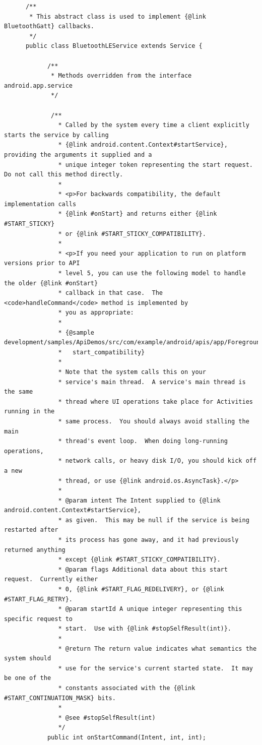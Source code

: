     \begin{lstlisting}
      /**
       * This abstract class is used to implement {@link BluetoothGatt} callbacks.
       */
      public class BluetoothLEService extends Service {

            /**
             * Methods overridden from the interface android.app.service
             */

             /**
               * Called by the system every time a client explicitly starts the service by calling
               * {@link android.content.Context#startService}, providing the arguments it supplied and a
               * unique integer token representing the start request.  Do not call this method directly.
               *
               * <p>For backwards compatibility, the default implementation calls
               * {@link #onStart} and returns either {@link #START_STICKY}
               * or {@link #START_STICKY_COMPATIBILITY}.
               *
               * <p>If you need your application to run on platform versions prior to API
               * level 5, you can use the following model to handle the older {@link #onStart}
               * callback in that case.  The <code>handleCommand</code> method is implemented by
               * you as appropriate:
               *
               * {@sample development/samples/ApiDemos/src/com/example/android/apis/app/ForegroundService.java
               *   start_compatibility}
               *
               * Note that the system calls this on your
               * service's main thread.  A service's main thread is the same
               * thread where UI operations take place for Activities running in the
               * same process.  You should always avoid stalling the main
               * thread's event loop.  When doing long-running operations,
               * network calls, or heavy disk I/O, you should kick off a new
               * thread, or use {@link android.os.AsyncTask}.</p>
               *
               * @param intent The Intent supplied to {@link android.content.Context#startService},
               * as given.  This may be null if the service is being restarted after
               * its process has gone away, and it had previously returned anything
               * except {@link #START_STICKY_COMPATIBILITY}.
               * @param flags Additional data about this start request.  Currently either
               * 0, {@link #START_FLAG_REDELIVERY}, or {@link #START_FLAG_RETRY}.
               * @param startId A unique integer representing this specific request to
               * start.  Use with {@link #stopSelfResult(int)}.
               *
               * @return The return value indicates what semantics the system should
               * use for the service's current started state.  It may be one of the
               * constants associated with the {@link #START_CONTINUATION_MASK} bits.
               *
               * @see #stopSelfResult(int)
               */
            public int onStartCommand(Intent, int, int);


\end{lstlisting}
